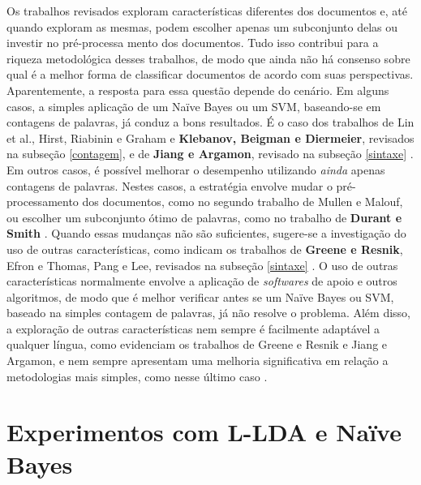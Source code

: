 Os trabalhos revisados exploram características diferentes dos documentos e, até quando exploram as mesmas, podem escolher apenas um subconjunto delas ou investir no pré-processa mento dos documentos. Tudo isso contribui para a riqueza metodológica desses trabalhos, de modo que ainda não há consenso sobre qual é a melhor forma de classificar documentos de acordo com suas perspectivas. Aparentemente, a resposta para essa questão depende do cenário. Em alguns casos, a simples aplicação de um Naïve Bayes ou um SVM, baseando-se em contagens de palavras, já conduz a bons resultados. É o caso dos trabalhos de Lin et al., Hirst, Riabinin e Graham e \textbf{Klebanov, Beigman e Diermeier}, revisados na subseção \ref{contagem}, e de \textbf{Jiang e Argamon}, revisado na subseção \ref{sintaxe} \cite{lin-et-al2006} \cite{hirst-et-al} \cite{klebanov} \cite{jiang-argamon}. Em outros casos, é possível melhorar o desempenho utilizando \emph{ainda} apenas contagens de palavras. Nestes casos, a estratégia envolve mudar o pré-processamento dos documentos, como no segundo trabalho de Mullen e Malouf, ou escolher um subconjunto ótimo de palavras, como no trabalho de \textbf{Durant e Smith} \cite{malouf-taking_sides} \cite{durant-smith}. Quando essas mudanças não são suficientes, sugere-se a investigação do uso de outras características, como indicam os trabalhos de \textbf{Greene e Resnik}, Efron e Thomas, Pang e Lee, revisados na subseção \ref{sintaxe} \cite{greene} \cite{efron} \cite{get-out-the-vote}. O uso de outras características normalmente envolve a aplicação de \emph{softwares} de apoio e outros algoritmos, de modo que é melhor verificar antes se um Naïve Bayes ou SVM, baseado na simples contagem de palavras, já não resolve o problema. Além disso, a exploração de outras características nem sempre é facilmente adaptável a qualquer língua, como evidenciam os trabalhos de Greene e Resnik e Jiang e Argamon, e nem sempre apresentam uma melhoria significativa em relação a metodologias mais simples, como nesse último caso \cite{greene} \cite{jiang-argamon}.
 
\section{Experimentos com L-LDA e Naïve Bayes}
\label{freqs:experim}

